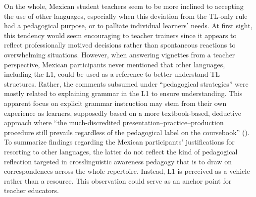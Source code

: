 \documentclass[output=paper]{../langscibook}
\begin{document}
On the whole, Mexican student teachers seem to be more inclined to accepting the use of other languages, especially when this deviation from the TL-only rule had a pedagogical purpose, or to palliate individual learners’ needs. At first sight, this tendency would seem encouraging to teacher trainers since it appears to reflect professionally motived decisions rather than spontaneous reactions to overwhelming situations. However, when answering vignettes from a teacher perspective, Mexican participants never mentioned that other languages, including the L1, could be used as a reference to better understand TL structures. Rather, the comments subsumed under “pedagogical strategies” were mostly related to explaining grammar in the L1 to ensure understanding. This apparent focus on explicit grammar instruction may stem from their own experience as learners, supposedly based on a more textbook-based, deductive approach where “the much-discredited presentation--practice--production procedure still prevails regardless of the pedagogical label on the coursebook” (\citealt{TomlinsonMasuhara2018}). To summarize findings regarding the Mexican participants’ justifications for resorting to other languages, the latter do not reflect the kind of pedagogical reflection targeted in crosslinguistic awareness pedagogy that is to draw on correspondences across the whole repertoire. Instead, L1 is perceived as a vehicle rather than a resource. This observation could serve as an anchor point for teacher educators.
\end{document}

